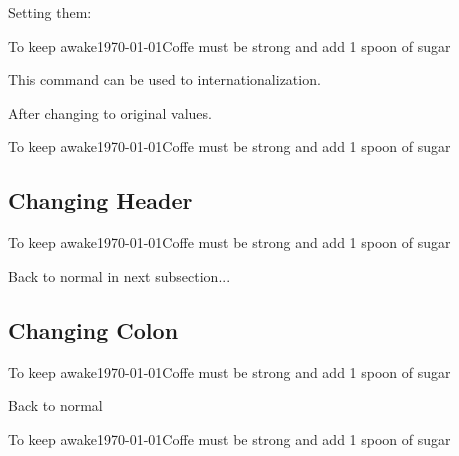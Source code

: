 \documentclass[12pt,a4paper]{article}
\begin{document}
Setting them:

%
{To keep awake}{\today}{Coffe must be strong and add 1 spoon of sugar}

 This command can be used to internationalization.

After changing to original values.

%
{To keep awake}{\today}{Coffe must be strong and add 1 spoon of sugar}


\subsection{Changing Header}

%
{To keep awake}{\today}{Coffe must be strong and add 1 spoon of sugar}

Back to normal in next subsection...

\subsection{Changing Colon}

\trsetcolon{$\leftarrow$}
%
{To keep awake}{\today}{Coffe must be strong and add 1 spoon of sugar}

Back to normal

\trsettitlelabel{}
\trsetcolon{:}
%
{To keep awake}{\today}{Coffe must be strong and add 1 spoon of sugar}



\newpage
\setlength{\cfttasksnumwidth}{20pt}
\newpage
\listoftasks
\end{document}
